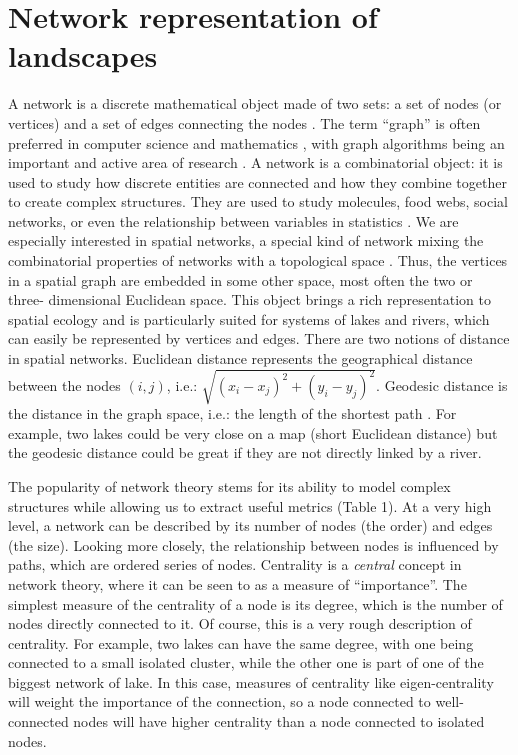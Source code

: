 \documentclass[12pt]{article}
\begin{document}
\section*{Network representation of landscapes}

A network is a discrete mathematical object made of two sets: a set of nodes
(or vertices) and a set of edges connecting the nodes \parencite{new10}. The
term ``graph'' is often preferred in computer science and mathematics
\parencite{gro06}, with graph algorithms being an important and active area of
research \parencite{sed01}. A network is a combinatorial object: it is used to study
how discrete entities are connected and how they combine together to create
complex structures. They are used to study molecules, food webs, social
networks, or even the relationship between variables in statistics
\parencite{wri21,new10}. We are especially interested in spatial networks, a special
kind of network mixing the combinatorial properties of networks with a
topological space \parencite{kob94}. Thus, the vertices in a spatial graph are
embedded in some other space, most often the two or three- dimensional Euclidean
space. This object brings a rich representation to spatial ecology and is
particularly suited for systems of lakes and rivers, which can easily be
represented by vertices and edges. There are two notions of distance in spatial
networks. Euclidean distance represents the geographical distance between the
nodes $(i, j)$, i.e.: $\sqrt{(x_i - x_j)^2 + (y_i - y_ j)^2}$. Geodesic
distance is the distance in the graph space, i.e.: the length of the shortest
path \parencite{dij59}. For example, two lakes could be very close on a map (short
Euclidean distance) but the geodesic distance could be great if they are not
directly linked by a river.

The popularity of network theory stems for its ability to model complex
structures while allowing us to extract useful metrics (Table 1). At a very high
level, a network can be described by its number of nodes (the order) and 
edges (the size). Looking more closely, the relationship between
nodes is influenced by paths, which are ordered series of nodes. Centrality
is a \emph{central} concept in network theory, where it can be seen
to as a measure of ``importance''. The simplest measure of the centrality of a
node is its degree, which is the number of nodes directly connected to it. Of
course, this is a very rough description of centrality. For example, two lakes
can have the same degree, with one being connected to a small isolated cluster,
while the other one is part of one of the biggest network of lake. In this case,
measures of centrality like eigen-centrality will weight the importance of the
connection, so a node connected to well-connected nodes will have higher
centrality than a node connected to isolated nodes.
\end{document}
